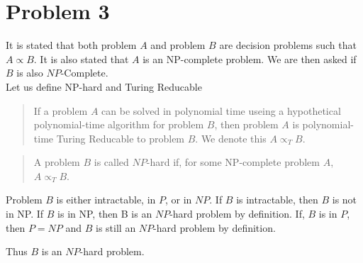 \section*{Problem 3}

It is stated that both problem $A$ and problem $B$ are decision problems such that $A \propto B$. It is also stated that $A$ is an NP-complete problem. We are then asked if $B$ is also $NP$-Complete.
\\
Let us define NP-hard and Turing Reducable

\begin{quote}
    If a problem $A$ can be solved in polynomial time useing a hypothetical 
    polynomial-time algorithm for problem $B$, then problem $A$ is 
    polynomial-time Turing Reducable to problem $B$. We denote this
    $A \propto_T B$.
\end{quote}

\begin{quote}
    A problem $B$ is called $NP$-hard if, for some NP-complete problem $A$,
    $A \propto_T B$.
\end{quote}

Problem $B$ is either intractable, in $P$, or in $NP$. If $B$ is intractable, 
then $B$ is not in NP. If $B$ is in NP, then B is an $NP$-hard problem by 
definition. If, $B$ is in $P$, then $P = NP$ and $B$ is still an $NP$-hard
problem by definition.

Thus $B$ is an $NP$-hard problem.
